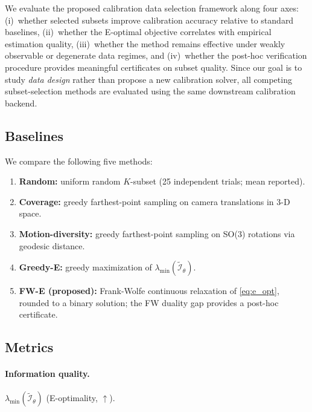 \documentclass[11pt]{article}
\begin{document}
We evaluate the proposed calibration data selection framework along four axes:
(i)~whether selected subsets improve calibration accuracy relative to
standard baselines,
(ii)~whether the E-optimal objective correlates with empirical estimation
quality,
(iii)~whether the method remains effective under weakly observable or
degenerate data regimes, and
(iv)~whether the post-hoc verification procedure provides meaningful
certificates on subset quality.
Since our goal is to study \emph{data design} rather than propose a new
calibration solver, all competing subset-selection methods are evaluated
using the same downstream calibration backend.

\subsection{Baselines}

We compare the following five methods:
\begin{enumerate}[leftmargin=1.5em]
    \item \textbf{Random:} uniform random $K$-subset (25 independent trials;
    mean reported).
    \item \textbf{Coverage:} greedy farthest-point sampling on camera
    translations in 3-D space.
    \item \textbf{Motion-diversity:} greedy farthest-point sampling on SO(3)
    rotations via geodesic distance.
    \item \textbf{Greedy-E:} greedy maximization of
    $\lambda_{\min}(\widetilde{\mathcal I}_{\theta})$.
    \item \textbf{FW-E (proposed):} Frank-Wolfe continuous relaxation of
    \eqref{eq:e_opt}, rounded to a binary solution; the FW duality gap
    provides a post-hoc certificate.
\end{enumerate}

\subsection{Metrics}

\paragraph{Information quality.}
$\lambda_{\min}(\widetilde{\mathcal I}_{\theta})$ (E-optimality, $\uparrow$).
\end{document}

